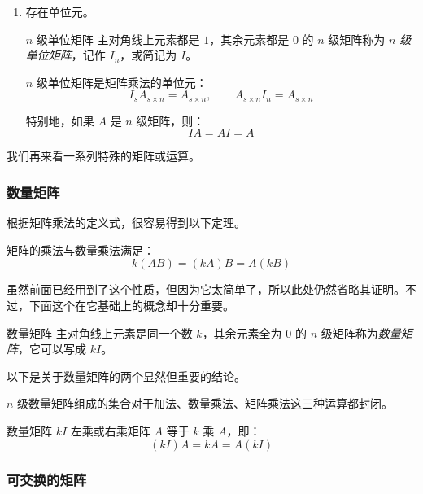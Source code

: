 \begin{enumerate}
	\item 存在单位元。

	\begin{definition}{$n$ 级单位矩阵}
		主对角线上元素都是 $1$，其余元素都是 $0$ 的 $n$ 级矩阵称为 \emph{$n$ 级单位矩阵}，记作 $I_n$，或简记为 $I$。
	\end{definition}

	\begin{theorem}
		$n$ 级单位矩阵是矩阵乘法的单位元：
		$$
		I_s A_{s \times n} = A_{s \times n}, \qquad A_{s \times n} I_n = A_{s \times n}
		$$

		特别地，如果 $A$ 是 $n$ 级矩阵，则：
		$$
		IA = AI = A
		$$
	\end{theorem}

\end{enumerate}

我们再来看一系列特殊的矩阵或运算。

\subsubsection{数量矩阵}

根据矩阵乘法的定义式，很容易得到以下定理。

\begin{theorem}
	矩阵的乘法与数量乘法满足：
	$$
	k(AB) = (kA)B = A(kB)
	$$
\end{theorem}

虽然前面已经用到了这个性质，但因为它太简单了，所以此处仍然省略其证明。不过，下面这个在它基础上的概念却十分重要。

\begin{definition}{数量矩阵}
	主对角线上元素是同一个数 $k$，其余元素全为 $0$ 的 $n$ 级矩阵称为\emph{数量矩阵}，它可以写成 $kI$。
\end{definition}

以下是关于数量矩阵的两个显然但重要的结论。

\begin{theorem}[数量矩阵的运算封闭性]
	$n$ 级数量矩阵组成的集合对于加法、数量乘法、矩阵乘法这三种运算都封闭。
\end{theorem}

\begin{theorem}
	数量矩阵 $kI$ 左乘或右乘矩阵 $A$ 等于 $k$ 乘 $A$，即：
	$$
	(kI)A = kA = A(kI)
	$$
\end{theorem}

\subsubsection{可交换的矩阵}

